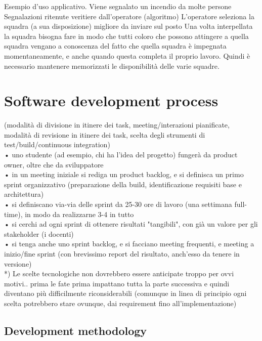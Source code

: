 \documentclass[a4paper,12pt]{report}
\begin{document}
Esempio d’uso applicativo.
Viene segnalato un incendio da molte persone 
Segnalazioni ritenute veritiere dall’operatore (algoritmo)
L’operatore seleziona la squadra (a sua disposizione) migliore da inviare sul posto 
Una volta interpellata la squadra bisogna fare in modo che tutti coloro che possono attingere a quella squadra vengano a conoscenza del fatto che quella squadra è impegnata momentaneamente, e anche quando questa completa il proprio lavoro. Quindi è necessario mantenere memorizzati le disponibilità delle varie squadre.\\


\chapter{Software development process}

(modalità di divisione in itinere dei task, meeting/interazioni pianificate, modalità di revisione in itinere dei task, scelta degli strumenti di test/build/continuous integration)\\
•	uno studente (ad esempio, chi ha l'idea del progetto) fungerà da product owner, oltre che da sviluppatore\\
•	in un meeting iniziale si rediga un product backlog, e si definisca un primo sprint organizzativo (preparazione della build, identificazione requisiti base e architettura)\\
•	si definiscano via-via delle sprint da 25-30 ore di lavoro (una settimana full-time), in modo da realizzarne 3-4 in tutto\\
•	si cerchi ad ogni sprint di ottenere risultati "tangibili", con già un valore per gli stakeholder (i docenti)\\
•	si tenga anche uno sprint backlog, e si facciano meeting frequenti, e meeting a inizio/fine sprint (con brevissimo report del risultato, anch'esso da tenere in versione)\\

*) Le scelte tecnologiche non dovrebbero essere anticipate troppo per ovvi motivi.. prima le fate prima impattano tutta la parte successiva e quindi diventano più difficilmente riconsiderabili (comunque in linea di principio ogni scelta potrebbero stare ovunque, dai requirement fino all'implementazione) \\

\section{Development methodology}
\end{document}
